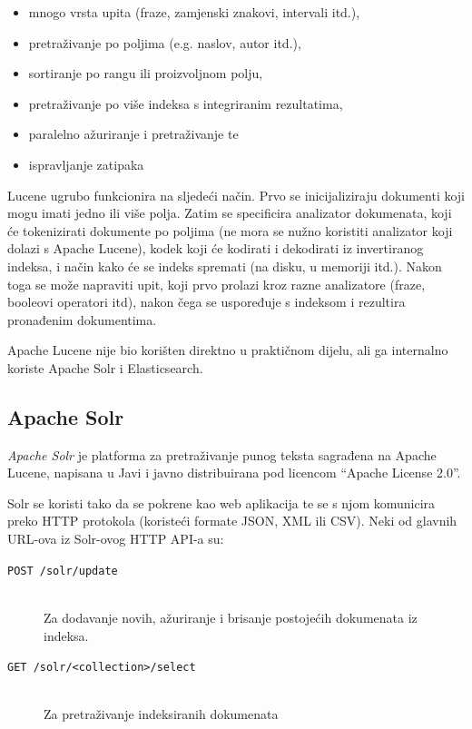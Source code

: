 \documentclass[a4paper,twoside,12pt]{scrreprt}
\begin{document}
\begin{itemize}
  \item mnogo vrsta upita (fraze, zamjenski znakovi, intervali itd.),
  \item pretraživanje po poljima (e.g. naslov, autor itd.),
  \item sortiranje po rangu ili proizvoljnom polju,
  \item pretraživanje po više indeksa s integriranim rezultatima,
  \item paralelno ažuriranje i pretraživanje te
  \item ispravljanje zatipaka
\end{itemize}

Lucene ugrubo funkcionira na sljedeći način. Prvo se inicijaliziraju dokumenti koji mogu imati jedno ili više polja. Zatim se specificira analizator dokumenata, koji će tokenizirati dokumente po poljima (ne mora se nužno koristiti analizator koji dolazi s Apache Lucene), kodek koji će kodirati i dekodirati iz invertiranog indeksa, i način kako će se indeks spremati (na disku, u memoriji itd.). Nakon toga se može napraviti upit, koji prvo prolazi kroz razne analizatore (fraze, booleovi operatori itd), nakon čega se uspoređuje s indeksom i rezultira pronađenim dokumentima.

Apache Lucene nije bio korišten direktno u praktičnom dijelu, ali ga internalno koriste Apache Solr i Elasticsearch.

\subsection{Apache Solr}

\textit{Apache Solr} je platforma za pretraživanje punog teksta sagrađena na Apache Lucene, napisana u Javi i javno distribuirana pod licencom ``Apache License 2.0''.

Solr se koristi tako da se pokrene kao web aplikacija te se s njom komunicira preko HTTP protokola (koristeći formate JSON, XML ili CSV). Neki od glavnih URL-ova iz Solr-ovog HTTP API-a su:

\begin{description}
  \item[\texttt{POST /solr/update}] \hfill \\ Za dodavanje novih, ažuriranje i brisanje postojećih dokumenata iz indeksa.
  \item[\texttt{GET /solr/<collection>/select}] \hfill \\ Za pretraživanje indeksiranih dokumenata
\end{description}
\end{document}
